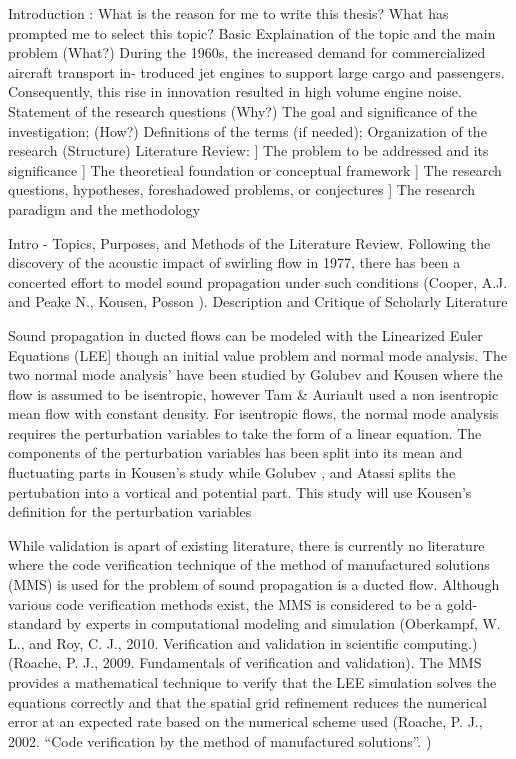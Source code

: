 \documentclass[a4paper]{report}
\begin{document}
\begin{outline}[enumerate]
    \1 Introduction : What is the reason for me to write this thesis? What has prompted me to 
    select this topic?
    \2 Basic Explaination of the topic and the main problem (What?)
    During the 1960s, the increased demand for commercialized aircraft transport in-
    troduced jet engines to support large cargo and passengers. Consequently, this rise in
    innovation resulted in high volume engine noise.
    \2 Statement of the research questions (Why?)
    \2 The goal and significance of the investigation; (How?)
    \2 Definitions of the terms (if needed);
    \2 Organization of the research (Structure)
    \1 Literature Review:
    \1[a]] The problem to be addressed and its significance
    \1[b]] The theoretical foundation or conceptual framework
    \1[c]] The research questions, hypotheses, foreshadowed problems, or conjectures
    \1[d]] The research paradigm and the methodology

    \2 Intro - Topics, Purposes, and Methods of the Literature Review.
    \3 Following the discovery of the acoustic impact of swirling flow in 
    1977, there has been a concerted effort to model sound propagation under
    such conditions (Cooper, A.J. and Peake N., Kousen, Posson ). 
    \2 Description and Critique of Scholarly Literature

    \3 Sound propagation in ducted flows can be modeled with the Linearized
    Euler Equations (LEE] though an initial value problem and normal mode analysis.
    The two normal mode analysis' have been studied by Golubev and Kousen where
    the flow is assumed to be isentropic, however Tam \& Auriault used a 
    non isentropic mean flow with constant density. For isentropic flows,
    the normal mode analysis requires the perturbation variables 
    to take the form of a linear equation. The components of the perturbation variables
    has been split into its mean and fluctuating parts in Kousen's study while
    Golubev , and Atassi splits the pertubation into a vortical and 
    potential part. This study will use Kousen's definition for the perturbation variables

    \4 While validation is apart of existing literature, there is currently
    no literature where the code verification technique of the method of 
    manufactured solutions (MMS) is used for the problem of sound propagation
    is a ducted flow. Although various code verification
    methods exist, the MMS is considered to be a gold-standard by experts 
    in computational modeling and simulation 
    (Oberkampf, W. L., and Roy, C. J., 2010. Verification and validation in scientific computing.)
    (Roache, P. J., 2009. Fundamentals of verification and validation). 
    The MMS provides a mathematical technique to verify that the LEE simulation 
    solves the equations correctly and that the spatial grid refinement 
    reduces the numerical error at an expected rate based on the numerical scheme used 
    (Roache, P. J., 2002. “Code verification by the method of manufactured solutions”. ) 


\end{outline}
\end{document}
